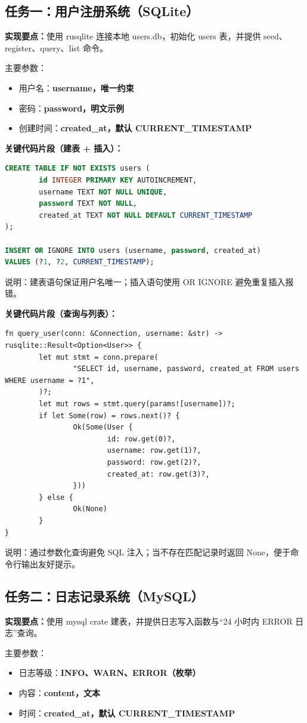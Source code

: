 \documentclass[12pt,a4paper]{ctexart}
\begin{document}
\subsection{任务一：用户注册系统（SQLite）}
\textbf{实现要点：}使用 rusqlite 连接本地 users.db，初始化 users 表，并提供 seed、register、query、list 命令。

主要参数：
\begin{itemize}
	\item 用户名：\textbf{username，唯一约束}
	\item 密码：\textbf{password，明文示例}
	\item 创建时间：\textbf{created\_at，默认 CURRENT\_TIMESTAMP}
\end{itemize}

\textbf{关键代码片段（建表 + 插入）：}
\begin{lstlisting}[language=SQL]
CREATE TABLE IF NOT EXISTS users (
		id INTEGER PRIMARY KEY AUTOINCREMENT,
		username TEXT NOT NULL UNIQUE,
		password TEXT NOT NULL,
		created_at TEXT NOT NULL DEFAULT CURRENT_TIMESTAMP
);

INSERT OR IGNORE INTO users (username, password, created_at)
VALUES (?1, ?2, CURRENT_TIMESTAMP);
\end{lstlisting}
\noindent 说明：建表语句保证用户名唯一；插入语句使用 OR IGNORE 避免重复插入报错。

\textbf{关键代码片段（查询与列表）：}
\begin{lstlisting}
fn query_user(conn: &Connection, username: &str) -> rusqlite::Result<Option<User>> {
		let mut stmt = conn.prepare(
				"SELECT id, username, password, created_at FROM users WHERE username = ?1",
		)?;
		let mut rows = stmt.query(params![username])?;
		if let Some(row) = rows.next()? {
				Ok(Some(User {
						id: row.get(0)?,
						username: row.get(1)?,
						password: row.get(2)?,
						created_at: row.get(3)?,
				}))
		} else {
				Ok(None)
		}
}
\end{lstlisting}
\noindent 说明：通过参数化查询避免 SQL 注入；当不存在匹配记录时返回 None，便于命令行输出友好提示。

\subsection{任务二：日志记录系统（MySQL）}
\textbf{实现要点：}使用 mysql crate 建表，并提供日志写入函数与“24 小时内 ERROR 日志”查询。

主要参数：
\begin{itemize}
	\item 日志等级：\textbf{INFO、WARN、ERROR（枚举）}
	\item 内容：\textbf{content，文本}
	\item 时间：\textbf{created\_at，默认 CURRENT\_TIMESTAMP}
\end{itemize}
\end{document}
